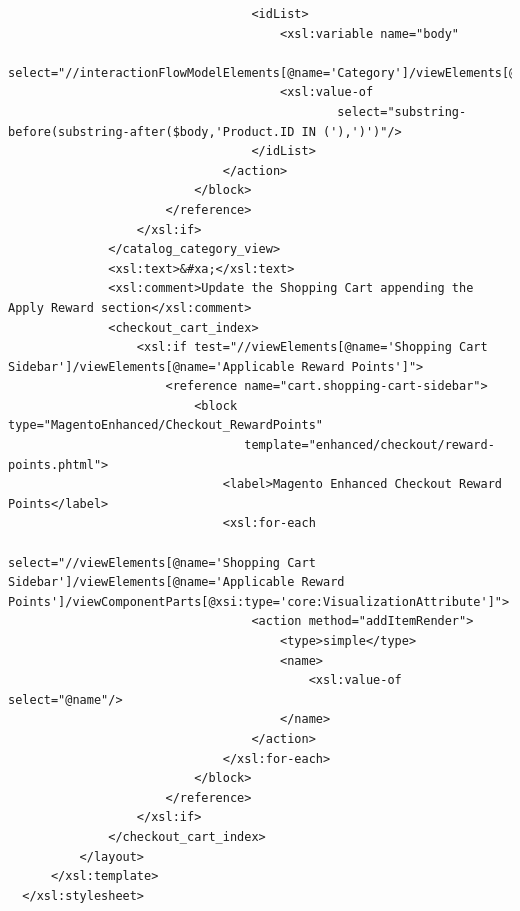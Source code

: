 \begin{lstlisting}
                                  <idList>
                                      <xsl:variable name="body"
                                                    select="//interactionFlowModelElements[@name='Category']/viewElements[@name='RecentlyViewedProducts']/viewComponentParts/subViewComponentParts/@body"/>
                                      <xsl:value-of
                                              select="substring-before(substring-after($body,'Product.ID IN ('),')')"/>
                                  </idList>
                              </action>
                          </block>
                      </reference>
                  </xsl:if>
              </catalog_category_view>
              <xsl:text>&#xa;</xsl:text>
              <xsl:comment>Update the Shopping Cart appending the Apply Reward section</xsl:comment>
              <checkout_cart_index>
                  <xsl:if test="//viewElements[@name='Shopping Cart Sidebar']/viewElements[@name='Applicable Reward Points']">
                      <reference name="cart.shopping-cart-sidebar">
                          <block type="MagentoEnhanced/Checkout_RewardPoints"
                                 template="enhanced/checkout/reward-points.phtml">
                              <label>Magento Enhanced Checkout Reward Points</label>
                              <xsl:for-each
                                      select="//viewElements[@name='Shopping Cart Sidebar']/viewElements[@name='Applicable Reward Points']/viewComponentParts[@xsi:type='core:VisualizationAttribute']">
                                  <action method="addItemRender">
                                      <type>simple</type>
                                      <name>
                                          <xsl:value-of select="@name"/>
                                      </name>
                                  </action>
                              </xsl:for-each>
                          </block>
                      </reference>
                  </xsl:if>
              </checkout_cart_index>
          </layout>
      </xsl:template>
  </xsl:stylesheet>
  
  
\end{lstlisting}
\vspace{0.5cm}

